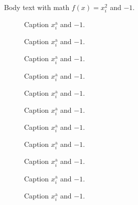 \documentclass{article}
\begin{document}
\printAffiliationsAndNotice{}

Body text with math $f(x) = x_{i}^{2}$ and $-1$.

\begin{figure}[htbp]
  \centering
  \caption{Caption $x_{i}^{\text{a}}$ and $-1$.}
\end{figure}
\clearpage

\begin{figure}[htbp]
  \centering
  \caption{Caption $x_{i}^{\text{a}}$ and $-1$.}
\end{figure}
\clearpage

\begin{figure}[htbp]
  \centering
  \caption{Caption $x_{i}^{\text{a}}$ and $-1$.}
\end{figure}
\clearpage

\begin{figure}[htbp]
  \centering
  \caption{Caption $x_{i}^{\text{a}}$ and $-1$.}
\end{figure}
\clearpage

\begin{figure}[htbp]
  \centering
  \caption{Caption $x_{i}^{\text{a}}$ and $-1$.}
\end{figure}
\clearpage

\begin{figure}[htbp]
  \centering
  \caption{Caption $x_{i}^{\text{a}}$ and $-1$.}
\end{figure}
\clearpage

\begin{figure}[htbp]
  \centering
  \caption{Caption $x_{i}^{\text{a}}$ and $-1$.}
\end{figure}
\clearpage

\begin{figure}[htbp]
  \centering
  \caption{Caption $x_{i}^{\text{a}}$ and $-1$.}
\end{figure}
\clearpage

\begin{figure}[htbp]
  \centering
  \caption{Caption $x_{i}^{\text{a}}$ and $-1$.}
\end{figure}
\clearpage

\begin{figure}[htbp]
  \centering
  \caption{Caption $x_{i}^{\text{a}}$ and $-1$.}
\end{figure}
\clearpage

\begin{figure}[htbp]
  \centering
  \caption{Caption $x_{i}^{\text{a}}$ and $-1$.}
\end{figure}
\clearpage
\end{document}
